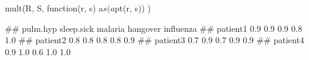\begin{Schunk}
% --begin: "comp.mult"
\begin{Sinput}
mult(R, S, function(r, s) {
  a$s(a$pt(r, s))
})
\end{Sinput}
\begin{Soutput}
##          pulm.hyp sleep.sick malaria hangover influenza
## patient1      0.9        0.9     0.9      0.8       1.0
## patient2      0.8        0.8     0.8      0.8       0.9
## patient3      0.7        0.9     0.7      0.9       0.9
## patient4      0.9        1.0     0.6      1.0       1.0
\end{Soutput}
%
% --end: "comp.mult"
\end{Schunk}
